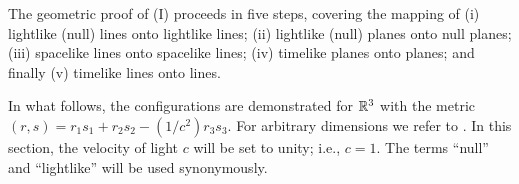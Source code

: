 
The geometric proof of (I) proceeds in five steps, covering the mapping of
(i) lightlike (null) lines onto lightlike lines;
(ii) lightlike (null) planes onto null planes;
(iii) spacelike lines onto spacelike lines;
(iv) timelike planes onto planes;
and finally (v) timelike lines onto lines.

In what follows, the configurations are demonstrated for ${\Bbb R}^3$
with the metric $(r,s)=r_1s_1+r_2s_2-(1/c^2)r_3s_3$.
For arbitrary dimensions we refer to \cite{benz}.
In this section, the velocity of light $c$ will be set to unity; i.e.,
$c=1$.
The terms ``null'' and ``lightlike'' will be used synonymously.

